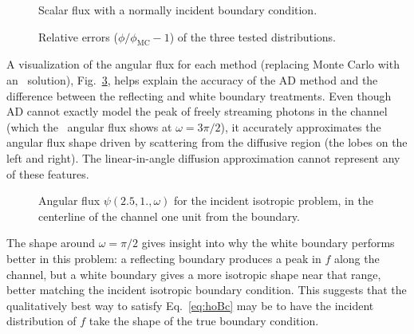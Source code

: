 \begin{figure}[tb]
  \centering
  \hspace{-.5in}
  
  \hspace{-.5in}
  \caption{Scalar flux with a normally incident boundary condition.}
  \label{fig:flatlandBcDelta}
\end{figure}
 
\begin{figure}[tb]
  \centering
  \hspace{-.5in}
  
  \hspace{-.5in}
  \caption{Relative errors ($\phi/\phi_\text{MC} - 1$) of the three tested
  distributions.}
  \label{fig:flatlandBcRelative}
\end{figure}

A visualization of the angular flux for each method (replacing Monte Carlo with
an \SN\ solution), Fig.~\ref{fig:bcChannelIsotropicAngular}, helps explain the
accuracy
of the AD method and the difference between the reflecting and white boundary
treatments. Even though AD cannot exactly model the peak of freely streaming
photons in the channel (which the \SN\ angular flux shows at $\omega=3\pi/2$),
it accurately approximates the angular flux shape driven by scattering from the
diffusive region (the lobes on the left and right).
The linear-in-angle diffusion approximation cannot represent any of these
features.  

\begin{figure}[htb]
  \centering\small
  \vspace{-.25in}
  \hspace{-.5in}
  
  \hspace{-.5in}
  \vspace{-.25in}
  \caption{Angular flux $\psi(2.5, 1., \omega)$ for the incident isotropic
  problem, in the centerline of the channel one unit from the boundary.}
  \label{fig:bcChannelIsotropicAngular}
\end{figure}

The shape around $\omega=\pi/2$ gives insight into why the white boundary
performs better in this problem: a reflecting boundary produces a peak in $f$
along the channel, but a white boundary gives a more isotropic shape near that
range, better matching the incident isotropic boundary condition. This suggests
that the qualitatively best way to satisfy Eq.~\eqref{eq:hoBc} may be
to have the incident distribution of $f$ take the shape of the true boundary
condition.

